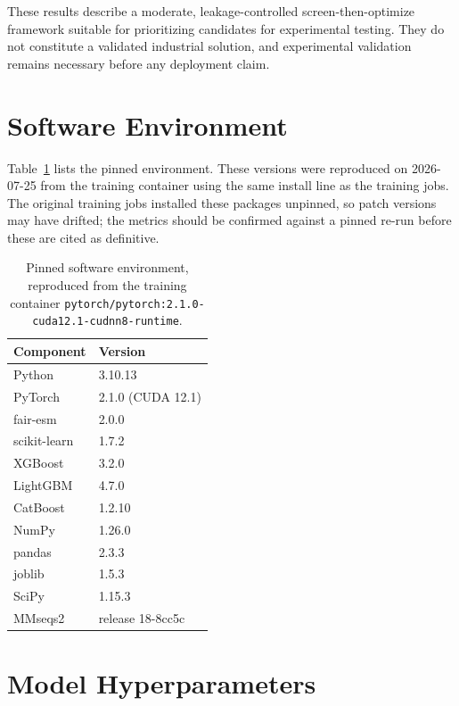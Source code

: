 \documentclass[journal,article,submit,moreauthors]{Definitions/mdpi}
\begin{document}
These results describe a moderate, leakage-controlled screen-then-optimize framework
suitable for prioritizing candidates for experimental testing. They do not constitute a
validated industrial solution, and experimental validation remains necessary before any
deployment claim.

\appendix
\section{Software Environment}
\label{app:software}

Table~\ref{tab:software} lists the pinned environment. These versions were reproduced on
2026-07-25 from the training container using the same install line as the training jobs.
The original training jobs installed these packages unpinned, so patch versions may have
drifted; the metrics should be confirmed against a pinned re-run before these are cited as
definitive.

\begin{table}[H]
\caption{Pinned software environment, reproduced from the training container
\texttt{pytorch/pytorch:2.1.0-cuda12.1-cudnn8-runtime}.}
\label{tab:software}
\begin{tabular}{ll}
\toprule
\textbf{Component} & \textbf{Version}\\
\midrule
Python              & 3.10.13\\
PyTorch             & 2.1.0 (CUDA 12.1)\\
fair-esm            & 2.0.0\\
scikit-learn        & 1.7.2\\
XGBoost             & 3.2.0\\
LightGBM            & 4.7.0\\
CatBoost            & 1.2.10\\
NumPy               & 1.26.0\\
pandas              & 2.3.3\\
joblib              & 1.5.3\\
SciPy               & 1.15.3\\
MMseqs2             & release 18-8cc5c\\
\bottomrule
\end{tabular}
\end{table}

\section{Model Hyperparameters}
\label{app:hyper}
\end{document}
